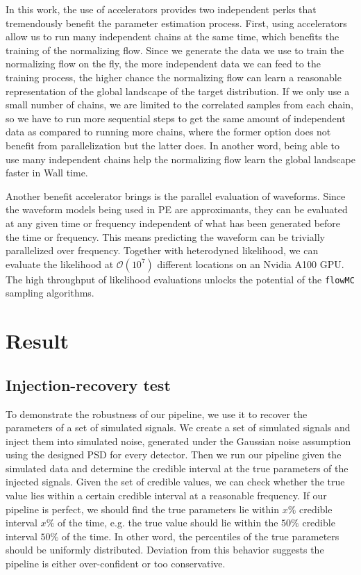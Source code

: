 \documentclass[twocolumn]{aastex631}
\begin{document}
In this work, the use of accelerators provides two independent perks that
tremendously benefit the parameter estimation process. First, using
accelerators allow us to run many independent chains at the same time, which
benefits the training of the normalizing flow. Since we generate the data we use
to train the normalizing flow on the fly, the more independent data we can feed
to the training process, the higher chance the normalizing flow can learn a
reasonable representation of the global landscape of the target distribution. If
we only use a small number of chains, we are limited to the correlated samples
from each chain, so we have to run more sequential steps to get the same amount
of independent data as compared to running more chains, where the former option does
not benefit from parallelization but the latter does. In another word, being
able to use many independent chains help the normalizing flow learn the global
landscape faster in Wall time.

Another benefit accelerator brings is the parallel evaluation of waveforms. Since
the waveform models being used in PE are approximants, they can be evaluated at
any given time or frequency independent of what has been generated before the
time or frequency. This means predicting the waveform can be trivially
parallelized over frequency. Together with heterodyned likelihood, we can
evaluate the likelihood at $\mathcal{O}(10^7)$ different locations on an Nvidia
A100 GPU. The high throughput of likelihood evaluations unlocks the potential of
the \texttt{flowMC} sampling algorithms.

\section{Result}
\label{sec: Result}
\subsection{Injection-recovery test}

To demonstrate the robustness of our pipeline, we use it to recover the
parameters of a set of simulated signals. We create a set of simulated signals
and inject them into simulated noise, generated under the Gaussian noise
assumption using the designed PSD for every detector. Then we run our pipeline
given the simulated data and determine the credible interval at the true
parameters of the injected signals. Given the set of credible values, we can
check whether the true value lies within a certain credible interval at a
reasonable frequency. If our pipeline is perfect, we should find the true
parameters lie within $x\%$ credible interval $x\%$ of the time, e.g. the true
value should lie within the $50\%$ credible interval $50\%$ of the time. In
other word, the percentiles of the true parameters should be uniformly
distributed. Deviation from this behavior suggests the pipeline is either
over-confident or too conservative. 
\end{document}
